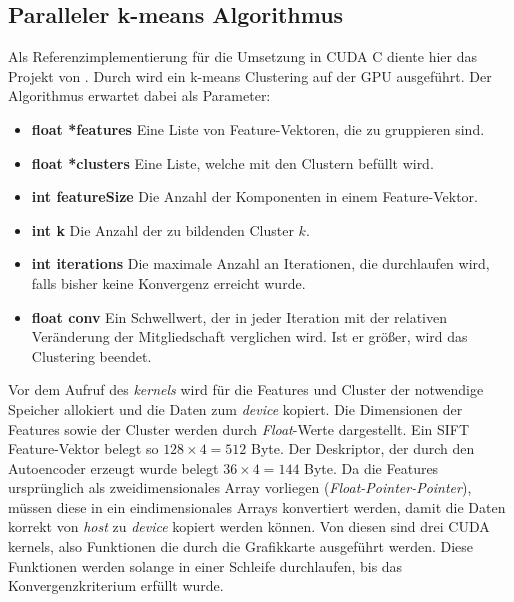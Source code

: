 \subsection{Paralleler k-means Algorithmus}

Als Referenzimplementierung für die Umsetzung in CUDA C diente hier das Projekt von \todo{[REF]}. Durch  wird ein k-means Clustering auf der GPU ausgeführt. Der Algorithmus erwartet dabei als Parameter:

\begin{itemize}
	\item \textbf{float *features} Eine Liste von Feature-Vektoren, die zu gruppieren sind.	
	\item \textbf{float *clusters} Eine Liste, welche mit den Clustern befüllt wird.
	\item \textbf{int featureSize} Die Anzahl der Komponenten in einem Feature-Vektor.
	\item \textbf{int k} Die Anzahl der zu bildenden Cluster $k$.
	\item \textbf{int iterations} Die maximale Anzahl an Iterationen, die durchlaufen wird, falls bisher keine Konvergenz erreicht wurde.
	\item \textbf{float conv} Ein Schwellwert, der in jeder Iteration mit der relativen Veränderung der Mitgliedschaft verglichen wird. Ist er größer, wird das Clustering beendet.
\end{itemize}

Vor dem Aufruf des \textit{kernels} wird für die Features und Cluster der notwendige Speicher allokiert und die Daten zum \textit{device} kopiert. Die Dimensionen der Features sowie der Cluster werden durch \textit{Float}-Werte dargestellt. Ein SIFT Feature-Vektor belegt so $128 \times 4 = 512$ Byte. Der Deskriptor, der durch den Autoencoder erzeugt wurde belegt $36 \times 4 = 144$ Byte. Da die Features ursprünglich als zweidimensionales Array vorliegen (\textit{Float-Pointer-Pointer}), müssen diese in ein eindimensionales Arrays konvertiert werden, damit die Daten korrekt von \textit{host} zu \textit{device} kopiert werden können. 
 Von diesen sind drei CUDA kernels, also Funktionen die durch die Grafikkarte ausgeführt werden. Diese Funktionen werden solange in einer Schleife durchlaufen, bis das Konvergenzkriterium erfüllt wurde.

